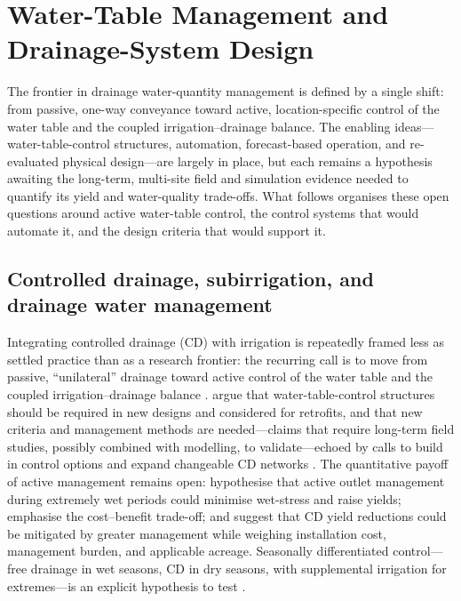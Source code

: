 \documentclass[11pt]{article}
\begin{document}
\section*{Water-Table Management and Drainage-System Design}

The frontier in drainage water-quantity management is defined by a single
shift: from passive, one-way conveyance toward active, location-specific
control of the water table and the coupled irrigation--drainage balance. The
enabling ideas---water-table-control structures, automation, forecast-based
operation, and re-evaluated physical design---are largely in place, but each
remains a hypothesis awaiting the long-term, multi-site field and simulation
evidence needed to quantify its yield and water-quality trade-offs. What
follows organises these open questions around active water-table control, the
control systems that would automate it, and the design criteria that would
support it.

\subsection{Controlled drainage, subirrigation, and drainage water management}

Integrating controlled drainage (CD) with irrigation is repeatedly framed less
as settled practice than as a research frontier: the recurring call is to move
from passive, ``unilateral'' drainage toward active control of the water table
and the coupled irrigation--drainage balance
\parencite{Ayars2006b,Kesicka2023b,Ritzema2023}. \textcite{Ayars2006b} argue
that water-table-control structures should be required in new designs and
considered for retrofits, and that new criteria and management methods are
needed---claims that require long-term field studies, possibly combined with
modelling, to validate---echoed by calls to build in control options and expand
changeable CD networks \parencite{Dukhovny2018,Mahmoud2021,Strock2011}. The
quantitative payoff of active management remains open: \textcite{Watkins2024}
hypothesise that active outlet management during extremely wet periods could
minimise wet-stress and raise yields; \textcite{Saadat2017} emphasise the
cost--benefit trade-off; and \textcite{Helmers2012} suggest that CD yield
reductions could be mitigated by greater management while weighing installation
cost, management burden, and applicable acreage. Seasonally differentiated
control---free drainage in wet seasons, CD in dry seasons, with supplemental
irrigation for extremes---is an explicit hypothesis to test
\parencite{Asgari2021}.
\end{document}
